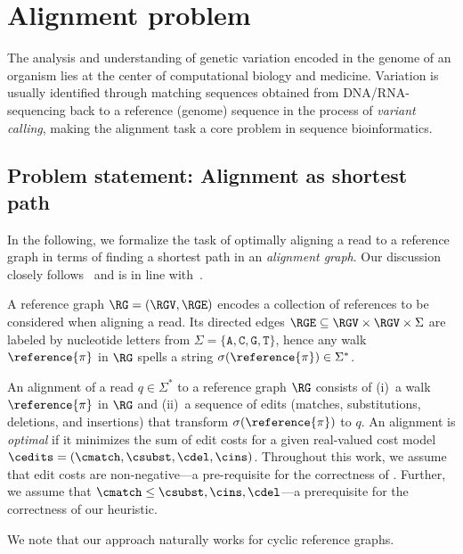\section{Alignment problem}

The analysis and understanding of genetic variation encoded in the genome of an
organism lies at the center of computational biology and medicine. Variation is
usually identified through matching sequences obtained from DNA/RNA-sequencing
back to a reference (genome) sequence in the process of \emph{variant calling},
making the alignment task a core problem in sequence bioinformatics.

\subsection{Problem statement: Alignment as shortest path} \label{SEEDsec:task}
%
In the following, we formalize the task of optimally aligning a read to a
reference graph in terms of finding a shortest path in an \emph{alignment
graph}. Our discussion closely follows~\citep{ivanov2020astarix} and is in line
with~\citep{rautiainen_aligning_2017}.

%
A reference graph $\RG=(\RGV,\RGE)$ encodes a collection of references to be
considered when aligning a read. Its directed edges $\RGE \subseteq \RGV \times
\RGV \times \Sigma$ are labeled by nucleotide letters from $\Sigma =
\{\texttt{A},\texttt{C},\texttt{G},\texttt{T}\}$, hence any walk
$\reference{\pi}$ in $\RG$ spells a string $\sigma(\reference{\pi}) \in
\Sigma^*$.

An alignment of a read $q \in \Sigma^*$ to a reference graph $\RG$ consists of
(i)~a walk $\reference{\pi}$ in $\RG$ and (ii)~a sequence of edits (matches,
substitutions, deletions, and insertions) that transform
$\sigma(\reference{\pi})$ to $q$. An alignment is \emph{optimal} if it minimizes
the sum of edit costs for a given real-valued cost model $\cedits = (\cmatch,
\csubst,\cdel, \cins)$.
%
Throughout this work, we assume that edit costs are non-negative---a
pre-requisite for the correctness of \A. Further, we assume that $\cmatch \leq
\csubst, \cins, \cdel$---a prerequisite for the correctness of our heuristic.

We note that our approach naturally works for cyclic reference graphs.

